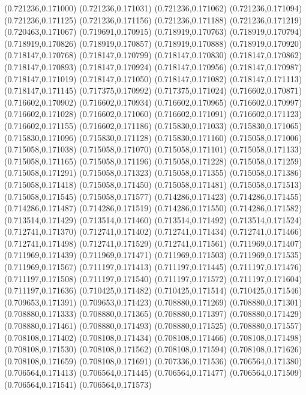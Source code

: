 (0.721236,0.171000)
(0.721236,0.171031)
(0.721236,0.171062)
(0.721236,0.171094)
(0.721236,0.171125)
(0.721236,0.171156)
(0.721236,0.171188)
(0.721236,0.171219)
(0.720463,0.171067)
(0.719691,0.170915)
(0.718919,0.170763)
(0.718919,0.170794)
(0.718919,0.170826)
(0.718919,0.170857)
(0.718919,0.170888)
(0.718919,0.170920)
(0.718147,0.170768)
(0.718147,0.170799)
(0.718147,0.170830)
(0.718147,0.170862)
(0.718147,0.170893)
(0.718147,0.170924)
(0.718147,0.170956)
(0.718147,0.170987)
(0.718147,0.171019)
(0.718147,0.171050)
(0.718147,0.171082)
(0.718147,0.171113)
(0.718147,0.171145)
(0.717375,0.170992)
(0.717375,0.171024)
(0.716602,0.170871)
(0.716602,0.170902)
(0.716602,0.170934)
(0.716602,0.170965)
(0.716602,0.170997)
(0.716602,0.171028)
(0.716602,0.171060)
(0.716602,0.171091)
(0.716602,0.171123)
(0.716602,0.171155)
(0.716602,0.171186)
(0.715830,0.171033)
(0.715830,0.171065)
(0.715830,0.171096)
(0.715830,0.171128)
(0.715830,0.171160)
(0.715058,0.171006)
(0.715058,0.171038)
(0.715058,0.171070)
(0.715058,0.171101)
(0.715058,0.171133)
(0.715058,0.171165)
(0.715058,0.171196)
(0.715058,0.171228)
(0.715058,0.171259)
(0.715058,0.171291)
(0.715058,0.171323)
(0.715058,0.171355)
(0.715058,0.171386)
(0.715058,0.171418)
(0.715058,0.171450)
(0.715058,0.171481)
(0.715058,0.171513)
(0.715058,0.171545)
(0.715058,0.171577)
(0.714286,0.171423)
(0.714286,0.171455)
(0.714286,0.171487)
(0.714286,0.171519)
(0.714286,0.171550)
(0.714286,0.171582)
(0.713514,0.171429)
(0.713514,0.171460)
(0.713514,0.171492)
(0.713514,0.171524)
(0.712741,0.171370)
(0.712741,0.171402)
(0.712741,0.171434)
(0.712741,0.171466)
(0.712741,0.171498)
(0.712741,0.171529)
(0.712741,0.171561)
(0.711969,0.171407)
(0.711969,0.171439)
(0.711969,0.171471)
(0.711969,0.171503)
(0.711969,0.171535)
(0.711969,0.171567)
(0.711197,0.171413)
(0.711197,0.171445)
(0.711197,0.171476)
(0.711197,0.171508)
(0.711197,0.171540)
(0.711197,0.171572)
(0.711197,0.171604)
(0.711197,0.171636)
(0.710425,0.171482)
(0.710425,0.171514)
(0.710425,0.171546)
(0.709653,0.171391)
(0.709653,0.171423)
(0.708880,0.171269)
(0.708880,0.171301)
(0.708880,0.171333)
(0.708880,0.171365)
(0.708880,0.171397)
(0.708880,0.171429)
(0.708880,0.171461)
(0.708880,0.171493)
(0.708880,0.171525)
(0.708880,0.171557)
(0.708108,0.171402)
(0.708108,0.171434)
(0.708108,0.171466)
(0.708108,0.171498)
(0.708108,0.171530)
(0.708108,0.171562)
(0.708108,0.171594)
(0.708108,0.171626)
(0.708108,0.171659)
(0.708108,0.171691)
(0.707336,0.171536)
(0.706564,0.171380)
(0.706564,0.171413)
(0.706564,0.171445)
(0.706564,0.171477)
(0.706564,0.171509)
(0.706564,0.171541)
(0.706564,0.171573)

